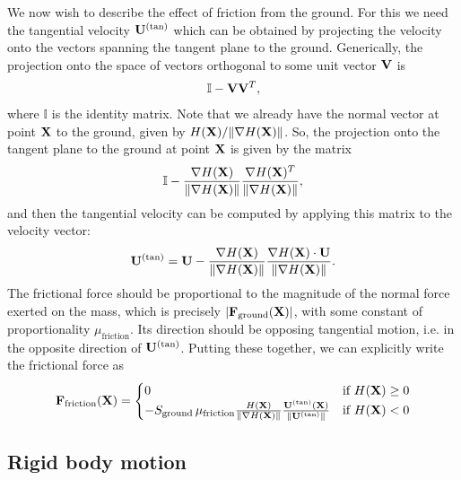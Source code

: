 \documentclass[10pt]{article}
\begin{document}
We now wish to describe the effect of friction from the ground.  For this we need the tangential velocity ${\bf U}^{(\text{tan})}$ which can be obtained by projecting the velocity onto the vectors spanning the tangent plane to the ground.  Generically, the projection onto the space of vectors orthogonal to some unit vector ${\bf V}$ is 
\begin{align*}
\mathbb{I} - {\bf V} {\bf V}^T,
\end{align*}
where $\mathbb{I}$ is the identity matrix.  Note that we already have the normal vector at point ${\bf X}$ to the ground, given by  $H({\bf X}) / \|\nabla H({\bf X})\|$.  So, the projection onto the tangent plane to the ground at point ${\bf X}$ is given by the matrix
\begin{align*}
\mathbb{I} -\frac{\nabla H({\bf X})}{\|\nabla H({\bf X})\|}\frac{\nabla H({\bf X})^T}{\|\nabla H({\bf X})\|},
\end{align*}
and then the tangential velocity can be computed by applying this matrix to the velocity vector:
\begin{align*}
{\bf U}^{(\text{tan})} = {\bf U} -\frac{\nabla H({\bf X})}{\|\nabla H({\bf X})\|}\frac{\nabla H({\bf X}) \cdot {\bf U}}{\|\nabla H({\bf X})\|}.
\end{align*}
The frictional force should be proportional to the magnitude of the normal force exerted on the mass, which is precisely $|{\bf F}_\text{ground}({\bf X})|$, with some constant of proportionality $\mu_\text{friction}$.  Its direction should be opposing tangential motion, i.e. in the opposite direction of ${\bf U}^{(\text{tan})}$.  Putting these together, we can explicitly write the frictional force as
\begin{align*}
{\bf F}_\text{friction}({\bf X}) = 
\begin{cases}
0 & \text{if }H({\bf X}) \geq 0 \\
-S_\text{ground}\,\mu_\text{friction} \frac{H({\bf X})}{\|\nabla H({\bf X})\|} \frac{{\bf U}^{(\text{tan})}({\bf X})}{\|{\bf U}^{(\text{tan})}\|} & \text{if }H({\bf X}) < 0
\end{cases}
\end{align*}

\subsection{Rigid body motion}
\end{document}
